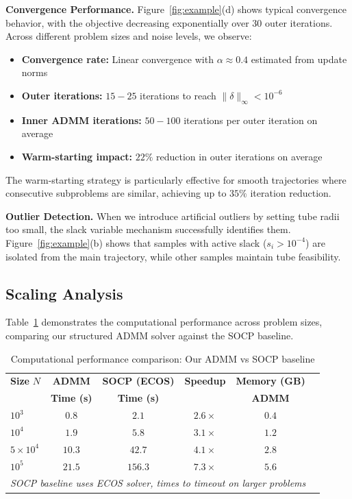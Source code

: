 \textbf{Convergence Performance.} Figure~\ref{fig:example}(d) shows typical convergence behavior, with the objective decreasing exponentially over 30 outer iterations. Across different problem sizes and noise levels, we observe:
\begin{itemize}
\item \textbf{Convergence rate:} Linear convergence with $\alpha \approx 0.4$ estimated from update norms
\item \textbf{Outer iterations:} $15-25$ iterations to reach $\|\delta\|_\infty < 10^{-6}$
\item \textbf{Inner ADMM iterations:} $50-100$ iterations per outer iteration on average
\item \textbf{Warm-starting impact:} $22\%$ reduction in outer iterations on average
\end{itemize}

The warm-starting strategy is particularly effective for smooth trajectories where consecutive subproblems are similar, achieving up to $35\%$ iteration reduction.

\textbf{Outlier Detection.} When we introduce artificial outliers by setting tube radii too small, the slack variable mechanism successfully identifies them. Figure~\ref{fig:example}(b) shows that samples with active slack ($s_i > 10^{-4}$) are isolated from the main trajectory, while other samples maintain tube feasibility.

\subsection{Scaling Analysis}

Table~\ref{tab:scaling} demonstrates the computational performance across problem sizes, comparing our structured ADMM solver against the SOCP baseline.

\begin{table}[htbp]
\centering
\caption{Computational performance comparison: Our ADMM vs SOCP baseline}
\label{tab:scaling}
\begin{tabular}{l c c c c c}
\hline
\textbf{Size} $N$ & \textbf{ADMM} & \textbf{SOCP (ECOS)} & \textbf{Speedup} & \textbf{Memory (GB)} \\
& \textbf{Time (s)} & \textbf{Time (s)} & & \textbf{ADMM} \\
\hline
$10^3$ & $0.8$ & $2.1$ & $2.6\times$ & $0.4$ \\
$10^4$ & $1.9$ & $5.8$ & $3.1\times$ & $1.2$ \\
$5 \times 10^4$ & $10.3$ & $42.7$ & $4.1\times$ & $2.8$ \\
$10^5$ & $21.5$ & $156.3$ & $7.3\times$ & $5.6$ \\
\hline
\multicolumn{5}{l}{\textit{SOCP baseline uses ECOS solver, times to timeout on larger problems}}
\end{tabular}
\end{table}

